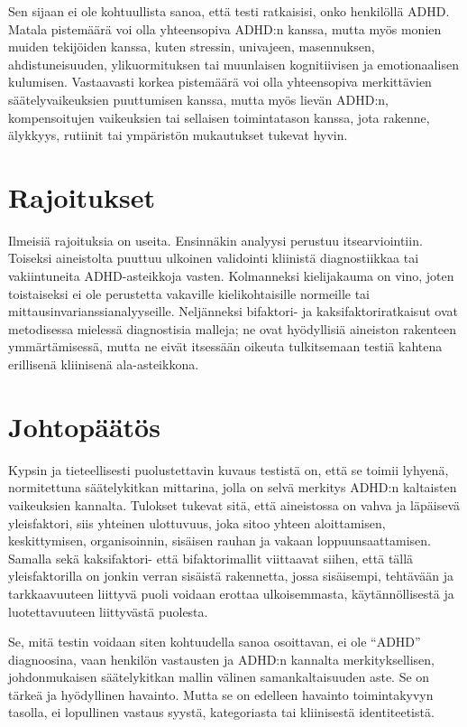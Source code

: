 \documentclass[11pt,a4paper]{article}
\begin{document}
Sen sijaan ei ole kohtuullista sanoa, että testi ratkaisisi, onko henkilöllä ADHD. Matala pistemäärä voi olla yhteensopiva ADHD:n kanssa, mutta myös monien muiden tekijöiden kanssa, kuten stressin, univajeen, masennuksen, ahdistuneisuuden, ylikuormituksen tai muunlaisen kognitiivisen ja emotionaalisen kulumisen. Vastaavasti korkea pistemäärä voi olla yhteensopiva merkittävien säätelyvaikeuksien puuttumisen kanssa, mutta myös lievän ADHD:n, kompensoitujen vaikeuksien tai sellaisen toimintatason kanssa, jota rakenne, älykkyys, rutiinit tai ympäristön mukautukset tukevat hyvin.

\section{Rajoitukset}
Ilmeisiä rajoituksia on useita. Ensinnäkin analyysi perustuu itsearviointiin. Toiseksi aineistolta puuttuu ulkoinen validointi kliinistä diagnostiikkaa tai vakiintuneita ADHD-asteikkoja vasten. Kolmanneksi kielijakauma on vino, joten toistaiseksi ei ole perustetta vakaville kielikohtaisille normeille tai mittausinvarianssianalyyseille. Neljänneksi bifaktori- ja kaksifaktoriratkaisut ovat metodisessa mielessä diagnostisia malleja; ne ovat hyödyllisiä aineiston rakenteen ymmärtämisessä, mutta ne eivät itsessään oikeuta tulkitsemaan testiä kahtena erillisenä kliinisenä ala-asteikkona.

\section{Johtopäätös}
Kypsin ja tieteellisesti puolustettavin kuvaus testistä on, että se toimii lyhyenä, normitettuna säätelykitkan mittarina, jolla on selvä merkitys ADHD:n kaltaisten vaikeuksien kannalta. Tulokset tukevat sitä, että aineistossa on vahva ja läpäisevä yleisfaktori, siis yhteinen ulottuvuus, joka sitoo yhteen aloittamisen, keskittymisen, organisoinnin, sisäisen rauhan ja vakaan loppuunsaattamisen. Samalla sekä kaksifaktori- että bifaktorimallit viittaavat siihen, että tällä yleisfaktorilla on jonkin verran sisäistä rakennetta, jossa sisäisempi, tehtävään ja tarkkaavuuteen liittyvä puoli voidaan erottaa ulkoisemmasta, käytännöllisestä ja luotettavuuteen liittyvästä puolesta.

Se, mitä testin voidaan siten kohtuudella sanoa osoittavan, ei ole ``ADHD'' diagnoosina, vaan henkilön vastausten ja ADHD:n kannalta merkityksellisen, johdonmukaisen säätelykitkan mallin välinen samankaltaisuuden aste. Se on tärkeä ja hyödyllinen havainto. Mutta se on edelleen havainto toimintakyvyn tasolla, ei lopullinen vastaus syystä, kategoriasta tai kliinisestä identiteetistä.

\printbibliography
\end{document}
